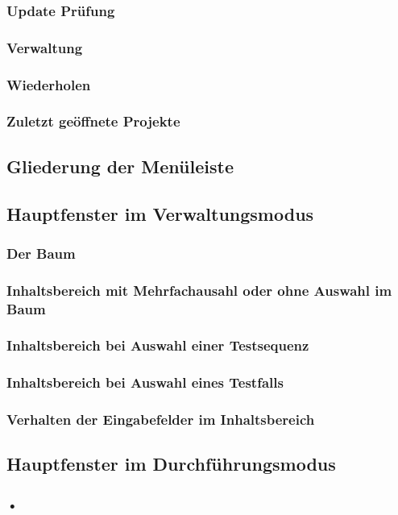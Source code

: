 \documentclass[a4paper,10pt]{scrartcl}
\begin{document}
\subsubsection{Update Prüfung}
\subsubsection{Verwaltung}
\subsubsection{Wiederholen}
\subsubsection{Zuletzt geöffnete Projekte}
\subsection{Gliederung der Menüleiste}
\subsection{Hauptfenster im Verwaltungsmodus}
\subsubsection{Der Baum}
\subsubsection{Inhaltsbereich mit Mehrfachausahl oder ohne Auswahl im Baum}
\subsubsection{Inhaltsbereich bei Auswahl einer Testsequenz}
\subsubsection{Inhaltsbereich bei Auswahl eines Testfalls}
\subsubsection{Verhalten der Eingabefelder im Inhaltsbereich}
\subsection{Hauptfenster im Durchführungsmodus}
\subsubsection{•}
\end{document}
